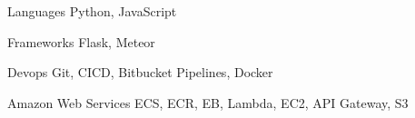 
\begin{cvskills}
  \cvskill
    {Languages} %
    {Python, JavaScript} %

  \cvskill
    {Frameworks} %
    {Flask, Meteor} %

  \cvskill
    {Devops} %
    {Git, CICD, Bitbucket Pipelines, Docker} %

  \cvskill
    {Amazon Web Services} %
    {ECS, ECR, EB, Lambda, EC2, API Gateway, S3} %
\end{cvskills}
